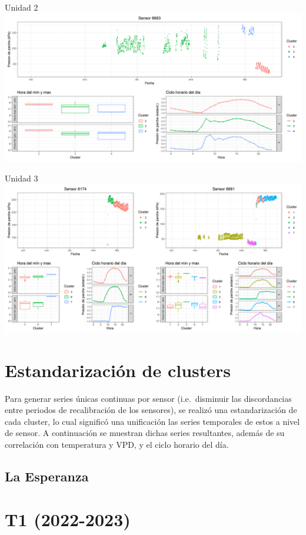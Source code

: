 \documentclass[
  letterpaper,
  DIV=11,
  numbers=noendperiod]{scrreprt}
\begin{document}
Unidad 2
\includegraphics{figuras/02_turgor_limpiado/2023_2024_Rio_Claro_T4_Unidad_2.png}

Unidad 3
\includegraphics{figuras/02_turgor_limpiado/2023_2024_Rio_Claro_T4_Unidad_3.png}

\chapter{Estandarización de
clusters}\label{estandarizaciuxf3n-de-clusters}

Para generar series únicas continuas por sensor (i.e.~disminuir las
discordancias entre periodos de recalibración de los sensores), se
realizó una estandarización de cada cluster, lo cual significó una
unificación las series temporales de estos a nivel de sensor. A
continuación se muestran dichas series resultantes, además de su
correlación con temperatura y VPD, y el ciclo horario del día.

\section{La Esperanza}\label{la-esperanza-3}

\chapter{T1 (2022-2023)}
\end{document}

